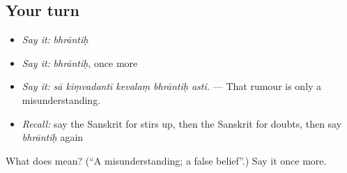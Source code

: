 \subsection*{Your turn}
\begin{itemize}
\raggedright
  \item \emph{Say it:} \emph{bhrāntiḥ}
  \item \emph{Say it:} \emph{bhrāntiḥ}, once more
  \item \emph{Say it:} \emph{sā kiṃvadantī kevalaṃ bhrāntiḥ asti.} — That rumour is only a misunderstanding.
  \item \emph{Recall:} say the Sanskrit for stirs up, then the Sanskrit for doubts, then say \emph{bhrāntiḥ} again
\end{itemize}

\begin{tcolorbox}[breakable,colback=teal!4,colframe=teal!35!black,title={Before you move on}]
What does  mean? (\textquotedblleft{}A misunderstanding; a false belief\textquotedblright{}.) Say it once more.
\end{tcolorbox}
